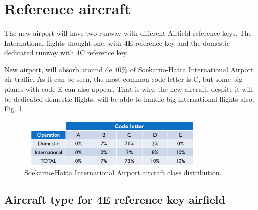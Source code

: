 \section{Reference aircraft}
\paragraph{} The new airport will have two runway with different Airfield reference keys. The International flights thought one, with 4E reference key and the domestic dedicated runway with 4C reference key.

New airport, will absorb around de 40\% of Soekarno-Hatta International Airport air traffic. As it can be seen, the most common code letter is C, but some big planes with code E can also appear. That is why, the new aircraft, despite it will be dedicated domestic flights, will be able to handle big international flights also, Fig. \ref{aircraftDist}.
\begin{figure}[H]
	\centering
	\includegraphics[clip, trim=0.1cm 0.1cm 0.1cm 0.1cm, width=0.8\textwidth]{./images/PROGNOSIS/aircraft/aircraftDist}
	\caption{Soekarno-Hatta International Airport aircraft class distribution.}
	\label{aircraftDist}
\end{figure}

	\subsection{Aircraft type for 4E reference key airfield}
